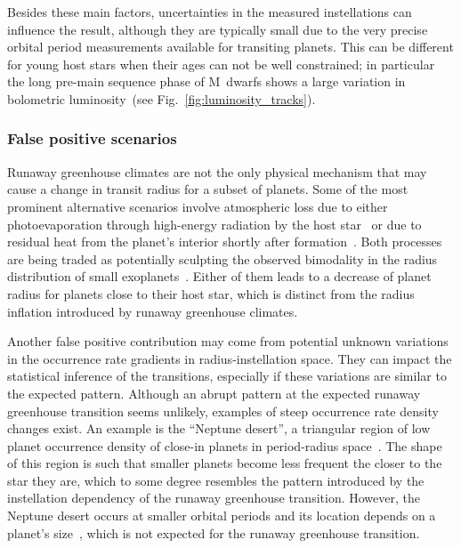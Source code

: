 \documentclass[twocolumn]{aastex631}
\begin{document}
Besides these main factors, uncertainties in the measured instellations can influence the result, although they are typically small due to the very precise orbital period measurements available for transiting planets.
This can be different for young host stars when their ages can not be well constrained; in particular the long pre-main sequence phase of M~dwarfs shows a large variation in bolometric luminosity~(see Fig.~\ref{fig:luminosity_tracks}).


\subsubsection{False positive scenarios}\label{sec:dis_falsepositive}
Runaway greenhouse climates are not the only physical mechanism that may cause a change in transit radius for a subset of planets.
Some of the most prominent alternative scenarios involve atmospheric loss due to either photoevaporation through high-energy radiation by the host star~\citep[e.g.,][]{Owen2013,Jin2014,Mordasini2020a} or due to residual heat from the planet's interior shortly after formation~\citep{Ginzburg2016b,Ginzburg2018,Gupta2019}.
Both processes are being traded as potentially sculpting the observed bimodality in the radius distribution of small exoplanets~\citep{Fulton2017,VanEylen2018}.
Either of them leads to a decrease of planet radius for planets close to their host star, which is distinct from the radius inflation introduced by runaway greenhouse climates.

Another false positive contribution may come from potential unknown variations in the occurrence rate gradients in radius-instellation space.
They can impact the statistical inference of the transitions, especially if these variations are similar to the expected pattern.
Although an abrupt pattern at the expected runaway greenhouse transition seems unlikely, examples of steep occurrence rate density changes exist.
An example is the ``Neptune desert'', a triangular region of low planet occurrence density of close-in planets in period-radius space~\citep{Szabo2011,Mazeh2016,Dreizler2020b}.
The shape of this region is such that smaller planets become less frequent the closer to the star they are, which to some degree resembles the pattern introduced by the instellation dependency of the runaway greenhouse transition.
However, the Neptune desert occurs at smaller orbital periods and its location depends on a planet's size~\citep{Szabo2011}, which is not expected for the runaway greenhouse transition.
\end{document}
